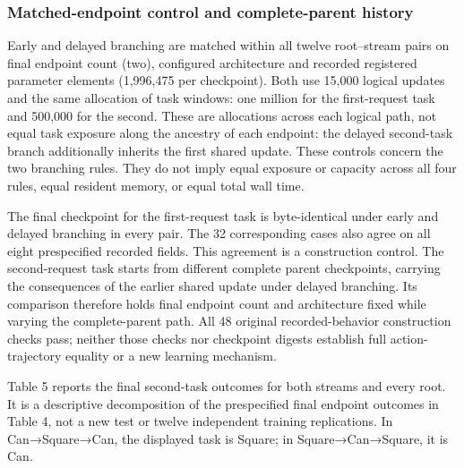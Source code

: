\documentclass[10pt,letterpaper]{article}
\begin{document}
\subsubsection{Matched-endpoint control and complete-parent
history}\label{matched-endpoint-control-and-complete-parent-history}

Early and delayed branching are matched within all twelve root--stream
pairs on final endpoint count (two), configured architecture and
recorded registered parameter elements (1,996,475 per checkpoint). Both
use 15,000 logical updates and the same allocation of task windows: one
million for the first-request task and 500,000 for the second. These are
allocations across each logical path, not equal task exposure along the
ancestry of each endpoint: the delayed second-task branch additionally
inherits the first shared update. These controls concern the two
branching rules. They do not imply equal exposure or capacity across all
four rules, equal resident memory, or equal total wall time.

The final checkpoint for the first-request task is byte-identical under
early and delayed branching in every pair. The 32 corresponding cases
also agree on all eight prespecified recorded fields. This agreement is
a construction control. The second-request task starts from different
complete parent checkpoints, carrying the consequences of the earlier
shared update under delayed branching. Its comparison therefore holds
final endpoint count and architecture fixed while varying the
complete-parent path. All 48 original recorded-behavior construction
checks pass; neither those checks nor checkpoint digests establish full
action-trajectory equality or a new learning mechanism.

Table 5 reports the final second-task outcomes for both streams and
every root. It is a descriptive decomposition of the prespecified final
endpoint outcomes in Table 4, not a new test or twelve independent
training replications. In Can→Square→Can, the displayed task is Square;
in Square→Can→Square, it is Can.
\end{document}
